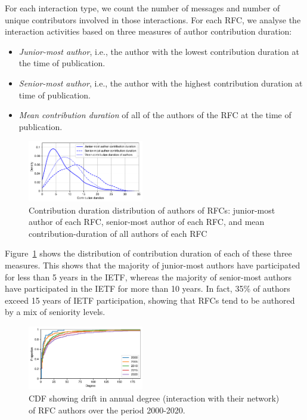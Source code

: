 \documentclass[twocolumn,10pt]{article}
\begin{document}
For each interaction type, we count the number of messages and number of
unique contributors involved in those interactions. For each RFC, we
analyse the interaction activities based on three measures of author
contribution duration:

\begin{itemize}
    \item \emph{Junior-most author}, i.e., the author with the lowest
      contribution duration at the time of publication.
    \item \emph{Senior-most author}, i.e., the author with the highest
      contribution duration at time of publication.
    \item \emph{Mean contribution duration} of all of the authors of the
      RFC at the time of publication.
\end{itemize}

\begin{figure}
\includegraphics[width=0.45\textwidth]{figures-prev/imc-2021/emails/age_authors_RFCs.pdf}
\caption{Contribution duration distribution of authors of RFCs: junior-most
  author of each RFC, senior-most author of each RFC, and mean
  contribution-duration of all authors of each RFC}
\label{fig:age_dist_rfc_authors}
\end{figure}

Figure~\ref{fig:age_dist_rfc_authors} shows the distribution of
contribution duration of each of these three measures. This shows that the
majority of junior-most authors have participated for less than 5 years in
the IETF, whereas the majority of senior-most authors have participated in
the IETF for more than 10 years. In fact, 35\% of authors exceed 15 years
of IETF participation, showing that RFCs tend to be authored by a mix of
seniority levels.

\begin{figure}
\includegraphics[width=0.45\textwidth]{figures-prev/imc-2021/emails/rfc_authors_degree.pdf}
\caption{CDF showing drift in annual degree (interaction with their
  network) of RFC authors over the period 2000-2020.}
\label{fig:degree_dist_rfc_authors}
\end{figure}
\end{document}
